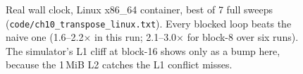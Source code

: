 \begin{figure}[htbp]
\centering
{}
\caption{Real wall clock, Linux x86\_64 container, best of 7 full
sweeps (\texttt{code/ch10\_transpose\_linux.txt}). Every blocked loop
beats the naive one (1.6--2.2$\times$ in this run; 2.1--3.0$\times$
for block-8 over six runs). The simulator's L1 cliff at block-16 shows
only as a bump here, because the 1\,MiB L2 catches the L1 conflict
misses.}
\label{fig:timing10}
\end{figure}
